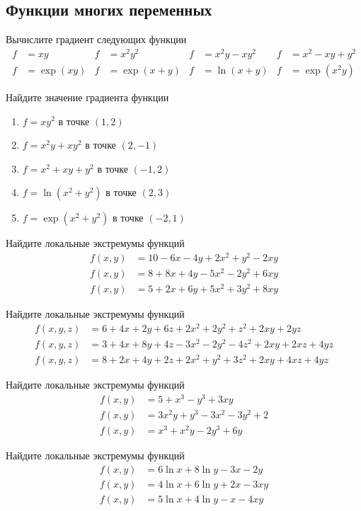 \subsection{Функции многих переменных}

\begin{exercise}
Вычислите градиент следующих функции
\begin{align*}
	f&=xy & f&=x^2y^2 &  f&=x^2y-xy^2 & f&=x^2-xy+y^2 \\
	f&=\exp(xy) & f&=\exp(x+y) & f&=\ln(x+y) & f&=\exp(x^2y)
\end{align*}
\end{exercise}

\begin{exercise}
Найдите значение градиента функции
\begin{enumerate}
	\item \(f=xy^2\) в точке \((1,2)\)
	\item \(f=x^2y+xy^2\) в точке \((2,-1)\)
	\item \(f=x^2+xy+y^2\) в точке \((-1,2)\)
	\item \(f=\ln(x^2+y^2)\) в точке \((2,3)\)
	\item \(f=\exp(x^2+y^2)\) в точке \((-2,1)\)
\end{enumerate}
\end{exercise}

\begin{exercise}
Найдите локальные экстремумы функций
\begin{align*}
	f(x,y) &= 10-6x-4y+2x^2+y^2-2xy \\
	f(x,y) &= 8+8x+4y-5x^2-2y^2+6xy \\
	f(x,y) &= 5+2x+6y+5x^2+3y^2+8xy
\end{align*}
\end{exercise}

\begin{exercise}
Найдите локальные экстремумы функций
\begin{align*}
	f(x,y,z) &= 6+4x+2y+6z+2x^2+2y^2+z^2+2xy+2yz \\
	f(x,y,z) &= 3+4x+8y+4z-3x^2-2y^2-4z^2+2xy+2xz+4yz\\
	f(x,y,z) &= 8+2x+4y+2z+2x^2+y^2+3z^2+2xy+4xz+4yz
\end{align*}
\end{exercise}
	
\begin{exercise}
Найдите локальные экстремумы функций
\begin{align*}
	f(x,y) &= 5+x^3-y^3+3xy \\
	f(x,y) &= 3x^2y+y^3-3x^2-3y^2+2 \\
	f(x,y) &= x^3+x^2y-2y^3+6y
\end{align*}
\end{exercise}

\begin{exercise}
Найдите локальные экстремумы функций
\begin{align*}
	f(x,y) &= 6\ln x+8\ln y-3x-2y \\
	f(x,y) &= 4\ln x+6\ln y+2x-3xy \\
	f(x,y) &= 5\ln x+4\ln y-x-4xy
\end{align*}
\end{exercise}